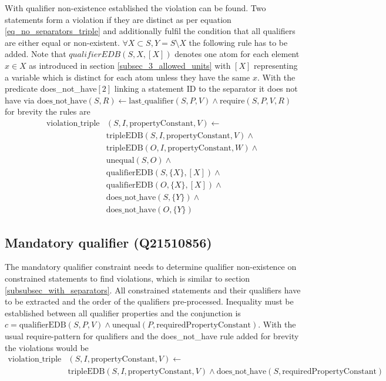 \documentclass[hyperref,bachelorofscience,fleqn]{cgvpub}
\begin{document}
With qualifier non-existence established the violation can be found. Two statements form a violation if they are distinct as per equation \ref{eq_no_separators_triple} and additionally fulfil the condition that all qualifiers are either equal or non-existent. \(\forall X \subset S, Y = S \setminus X\) the following rule has to be added. Note that \(qualifierEDB(S, {X}, [X])\) denotes one atom for each element \(x \in X\) as introduced in section \ref{subsec_3_allowed_units} with \([X]\) representing a variable which is distinct for each atom unless they have the same \(x\). With the predicate does\_not\_have\([2]\) linking a statement ID to the separator it does not have via \(\text{does\_not\_have}(S, R) \leftarrow \text{last\_qualifier}(S, P, V) \wedge \text{require}(S, P, V, R)\) for brevity the rules are
\begin{equation*}
\begin{split}
\text{violation\_triple}&(S, I, \text{propertyConstant}, V) \leftarrow \\
&\text{tripleEDB}(S, I, \text{propertyConstant}, V) \wedge \\
&\text{tripleEDB}(O, I, \text{propertyConstant}, W) \wedge \\
&\text{unequal}(S, O) \wedge \\
&\text{qualifierEDB}(S, \{X\}, [X]) \wedge \\
&\text{qualifierEDB}(O, \{X\}, [X]) \wedge \\
&\text{does\_not\_have}(S, \{Y\}) \wedge \\
&\text{does\_not\_have}(O, \{Y\})
\end{split}
\end{equation*}

\subsection{Mandatory qualifier (Q21510856)}
The mandatory qualifier constraint needs to determine qualifier non-existence on constrained statements to find violations, which is similar to section \ref{subsubsec_with_separators}. All constrained statements and their qualifiers have to be extracted and the order of the qualifiers pre-processed. Inequality must be established between all qualifier properties and the conjunction is \(c = \text{qualifierEDB}(S, P, V) \wedge \text{unequal}(P, \text{requiredPropertyConstant})\). With the usual require-pattern for qualifiers and the does\_not\_have rule added for brevity the violations would be
\begin{equation*}
\begin{split}
\text{violation\_triple}&(S, I, \text{propertyConstant}, V) \leftarrow \\
&\text{tripleEDB}(S, I, \text{propertyConstant}, V) \wedge \text{does\_not\_have}(S, \text{requiredPropertyConstant})
\end{split}
\end{equation*}
\end{document}
